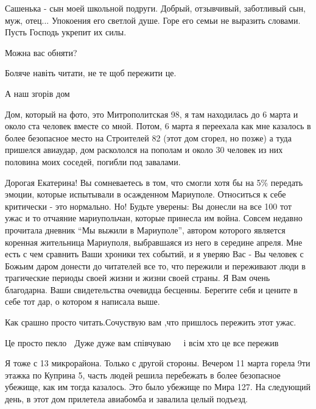 Сашенька - сын моей школьной подруги. Добрый, отзывчивый, заботливый сын, муж,
отец... Упокоения его светлой душе. Горе его семьи не выразить словами. Пусть
Господь укрепит их силы.


Можна вас обняти?

Боляче навіть читати, не те щоб пережити це.


А наш згорів дом


Дом, который на фото, это Митрополитская 98, я там находилась до 6 марта и
около ста человек вместе со мной. Потом, 6 марта я переехала как мне казалось в
более безопасное место на Строителей 82 (этот дом сгорел, но позже) а туда
пришелся авиаудар, дом раскололся на пополам и около 30 человек из них половина
моих соседей, погибли под завалами.


Дорогая Екатерина! Вы сомневаетесь в том, что смогли хотя бы на 5\% передать
эмоции, которые испытывали в осажденном Мариуполе. Относиться к себе критически
- это нормально. Но! Будьте уверены: Вы донесли на все 100 тот ужас и то
отчаяние мариупольчан, которые принесла им война. Совсем недавно прочитала
дневник \enquote{Мы выжили в Мариуполе}, автором которого является коренная жительница
Мариуполя, выбравшаяся из него в середине апреля. Мне есть с чем сравнить Ваши
хроники тех событий, и я уверяю Вас - Вы человек с Божьим даром донести до
читателей все то, что пережили и переживают люди в трагические периоды своей
жизни и жизни своей страны. Я Вам очень благодарна. Ваши свидетельства очевидца
бесценны. Берегите себя и цените в себе тот дар, о котором я написала выше.


Как срашно просто читать.Сочуствую вам ,что пришлось пережить этот ужас.


Це просто пекло 🙈 Дуже дуже вам співчуваю 🙏🙏🙏 і всім хто це все пережив


Я тоже с 13 микрорайона. Только с другой стороны. Вечером 11 марта горела 9ти
этажка по Куприна 5, часть людей решила перебежать в более безопасное убежище,
как им тогда казалось. Это было убежище по Мира 127. На следующий день, в этот
дом прилетела авиабомба и завалила целый подъезд.

